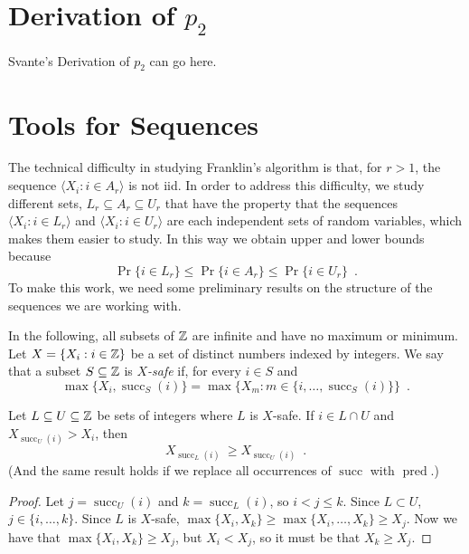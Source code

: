 \documentclass{patmorin}
\DeclareMathOperator{\cw}{succ}
\DeclareMathOperator{\ccw}{pred}
\begin{document}
\section{Derivation of $p_2$}

Svante's Derivation of $p_2$ can go here.

\section{Tools for Sequences}

The technical difficulty in studying Franklin's algorithm is that, for
$r>1$, the sequence $\langle X_i:i\in A_r\rangle$ is not iid.  In order
to address this difficulty, we study different sets, $L_r\subseteq
A_r\subseteq U_r$ that have the property that the sequences $\langle X_i:i\in
L_r\rangle$ and $\langle X_i:i\in U_r\rangle$ are each independent sets
of random variables, which makes them easier to study. In this way we
obtain upper and lower bounds because
\[
    \Pr\{i\in L_r\} \le \Pr\{i\in A_r\} \le \Pr\{i\in U_r\} \enspace .
\]
To make this work, we need some preliminary results on the structure of
the sequences we are working with.

In the following, all subsets of $\mathbb{Z}$ are infinite and have no maximum
or minimum.  Let $X=\{X_i:i\in \mathbb{Z}\}$ be a set of distinct numbers indexed
by integers.  We say that a subset $S\subseteq\mathbb{Z}$ is \emph{$X$-safe}
if, for every $i\in S$ and
\[
    \max\{X_i,\cw_S(i)\} = \max\{X_m: m\in \{i,\ldots,\cw_S(i)\}\} \enspace .
\]

%
\begin{lem}
   Let $L\subseteq U\subseteq\mathbb{Z}$ be sets of integers where $L$
   is $X$-safe.  If $i\in L\cap U$ and $X_{\cw_U(i)} > X_i$, then
   \[
         X_{\cw_L(i)}\ \ge X_{\cw_U(i)} \enspace . 
   \]
   (And the same result holds if we replace all occurrences of $\cw$
   with $\ccw$.)
\end{lem}

\begin{proof}
   Let $j = \cw_U(i)$ and $k=\cw_L(i)$, so $i < j \le k$.
   Since $L\subset U$, $j\in \{i,\ldots,k\}$.  Since $L$ is $X$-safe,
   $\max\{X_i,X_k\} \ge \max\{X_i,\ldots,X_k\} \ge X_j$.  Now we have
   that $\max\{X_i,X_k\} \ge X_j$, but $X_i < X_j$, so it must be that
   $X_k\ge X_j$.
\end{proof}
\end{document}
